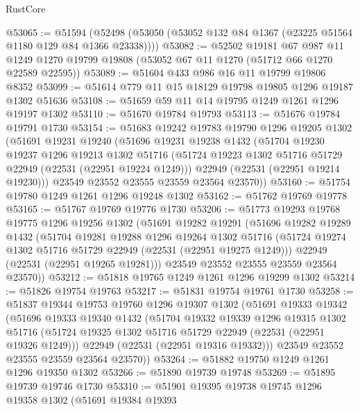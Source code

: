 \begin{lexlean}{RustCore}
\begin{coremodule}
@53065 := @51594
    (@52498 (@53050 (@53052 @132 @84 @1367 (@23225 @51564 @1180 @129 @84 @1366 @23338))))
@53082 := @52502
    @19181
    @67
    @987
    @11
    @1249
    @1270
    @19799
    @19808
    (@53052 @67 @11 @1270 (@51712 @66 @1270 @22589 @22595))
@53089 := @51604 @433 @986 @16 @11 @19799 @19806 @8352
@53099 := @51614 @779 @11 @15 @18129 @19798 @19805 @1296 @19187 @1302 @51636
@53108 := @51659 @59 @11 @14 @19795 @1249 @1261 @1296 @19197 @1302
@53110 := @51670 @19784 @19793
@53113 := @51676 @19784 @19791 @1730
@53154 := @51683
    @19242
    @19783
    @19790
    @1296
    @19205
    @1302
    (@51691
      @19231
      @19240
      (@51696
        @19231
        @19238
        @1432
        (@51704
          @19230
          @19237
          @1296
          @19213
          @1302
          @51716
          (@51724 @19223 @1302 @51716 @51729 @22949 (@22531 (@22951 @19224 @1249)))
          @22949
          (@22531 (@22951 @19214 @19230)))
        @23549
        @23552
        @23555
        @23559
        @23564
        @23570))
@53160 := @51754 @19780 @1249 @1261 @1296 @19248 @1302
@53162 := @51762 @19769 @19778
@53165 := @51767 @19769 @19776 @1730
@53206 := @51773
    @19293
    @19768
    @19775
    @1296
    @19256
    @1302
    (@51691
      @19282
      @19291
      (@51696
        @19282
        @19289
        @1432
        (@51704
          @19281
          @19288
          @1296
          @19264
          @1302
          @51716
          (@51724 @19274 @1302 @51716 @51729 @22949 (@22531 (@22951 @19275 @1249)))
          @22949
          (@22531 (@22951 @19265 @19281)))
        @23549
        @23552
        @23555
        @23559
        @23564
        @23570))
@53212 := @51818 @19765 @1249 @1261 @1296 @19299 @1302
@53214 := @51826 @19754 @19763
@53217 := @51831 @19754 @19761 @1730
@53258 := @51837
    @19344
    @19753
    @19760
    @1296
    @19307
    @1302
    (@51691
      @19333
      @19342
      (@51696
        @19333
        @19340
        @1432
        (@51704
          @19332
          @19339
          @1296
          @19315
          @1302
          @51716
          (@51724 @19325 @1302 @51716 @51729 @22949 (@22531 (@22951 @19326 @1249)))
          @22949
          (@22531 (@22951 @19316 @19332)))
        @23549
        @23552
        @23555
        @23559
        @23564
        @23570))
@53264 := @51882 @19750 @1249 @1261 @1296 @19350 @1302
@53266 := @51890 @19739 @19748
@53269 := @51895 @19739 @19746 @1730
@53310 := @51901
    @19395
    @19738
    @19745
    @1296
    @19358
    @1302
    (@51691
      @19384
      @19393

\end{coremodule}
\end{lexlean}
